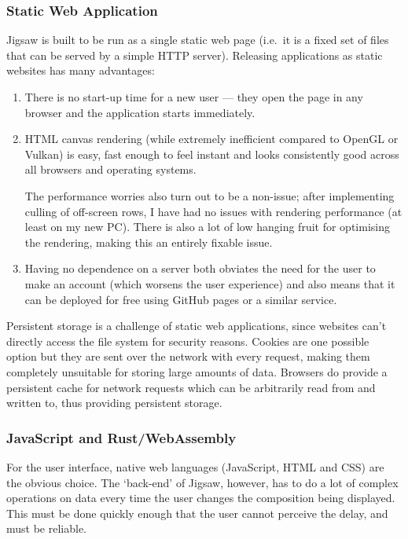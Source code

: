 \documentclass[12pt]{article}
\begin{document}
\subsubsection{Static Web Application}

Jigsaw is built to be run as a single static web page (i.e.\ it is a fixed set of files that can be
served by a simple HTTP server).  Releasing applications as static websites has many advantages:

\begin{enumerate}
    \item There is no start-up time for a new user --- they open the page in any browser and the
        application starts immediately.
    \item HTML canvas rendering (while extremely inefficient compared to OpenGL or Vulkan) is easy,
        fast enough to feel instant and looks consistently good across all browsers and operating
        systems.

        The performance worries also turn out to be a non-issue; after implementing culling of
        off-screen rows, I have had no issues with rendering performance (at least on my new PC).
        There is also a lot of low hanging fruit for optimising the rendering, making this an
        entirely fixable issue.
    \item Having no dependence on a server both obviates the need for the user to make an account
        (which worsens the user experience) and also means that it can be deployed for free using
        GitHub pages or a similar service.
\end{enumerate}

Persistent storage is a challenge of static web applications, since websites can't directly access
the file system for security reasons.  Cookies are one possible option but they are sent over the
network with every request, making them completely unsuitable for storing large amounts of data.
Browsers do provide a persistent cache for network requests which can be arbitrarily read from and
written to, thus providing persistent storage.

\subsubsection{JavaScript and Rust/WebAssembly}

For the user interface, native web languages (JavaScript, HTML and CSS) are the obvious choice.  The
`back-end' of Jigsaw, however, has to do a lot of complex operations on data every time the user
changes the composition being displayed.  This must be done quickly enough that the user cannot
perceive the delay, and must be reliable.
\end{document}
